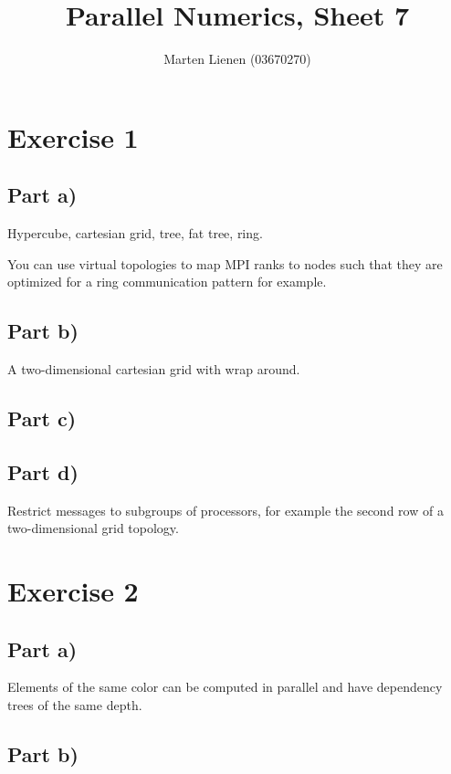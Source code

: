 \documentclass[10pt,a4paper]{article}
\title{Parallel Numerics, Sheet 7}
\author{Marten Lienen (03670270)}
\begin{document}
\maketitle

\section*{Exercise 1}

\subsection*{Part a)}

Hypercube, cartesian grid, tree, fat tree, ring.

You can use virtual topologies to map MPI ranks to nodes such that they are optimized for a ring communication pattern for example.

\subsection*{Part b)}

A two-dimensional cartesian grid with wrap around.

\subsection*{Part c)}

\subsection*{Part d)}

Restrict messages to subgroups of processors, for example the second row of a two-dimensional grid topology.

\section*{Exercise 2}

\subsection*{Part a)}

Elements of the same color can be computed in parallel and have dependency trees of the same depth.

\subsection*{Part b)}
\end{document}
